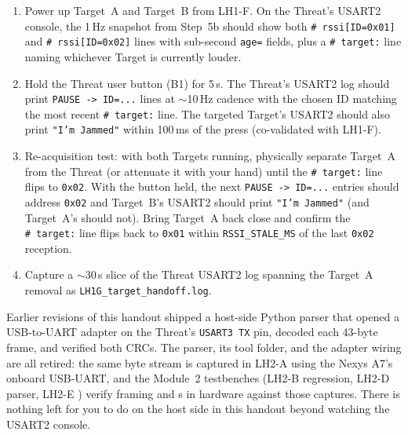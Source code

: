 \documentclass[11pt,letterpaper]{article}
\begin{document}
\begin{enumerate}[leftmargin=2em]
	\item Power up Target~A and Target~B from LH1-F. On the Threat's USART2 console, the 1\,Hz snapshot from Step~5b should show both \texttt{\#~rssi[ID=0x01]} and \texttt{\#~rssi[ID=0x02]} lines with sub-second \texttt{age=} fields, plus a \texttt{\#~target:} line naming whichever Target is currently louder.
	\item Hold the Threat user button (B1) for 5\,s. The Threat's USART2 log should print \texttt{PAUSE -> ID=...} lines at $\sim$10\,Hz cadence with the chosen ID matching the most recent \texttt{\#~target:} line. The targeted Target's USART2 should also print \texttt{"I'm Jammed"} within 100\,ms of the press (co-validated with LH1-F).
	\item Re-acquisition test: with both Targets running, physically separate Target~A from the Threat (or attenuate it with your hand) until the \texttt{\#~target:} line flips to \texttt{0x02}. With the button held, the next \texttt{PAUSE -> ID=...} entries should address \texttt{0x02} and Target~B's USART2 should print \texttt{"I'm Jammed"} (and Target~A's should not). Bring Target~A back close and confirm the \texttt{\#~target:} line flips back to \texttt{0x01} within \texttt{RSSI\_STALE\_MS} of the last \texttt{0x02} reception.
	\item Capture a $\sim$30\,s slice of the Threat USART2 log spanning the Target~A removal as \texttt{LH1G\_target\_handoff.log}.
\end{enumerate}

\begin{tcolorbox}[infobox={Where frame-level \CRC{} validation moved}]
Earlier revisions of this handout shipped a host-side Python parser that opened a USB-to-UART adapter on the Threat's \texttt{USART3 TX} pin, decoded each 43-byte frame, and verified both CRCs. The parser, its tool folder, and the adapter wiring are all retired: the same byte stream is captured in LH2-A using the Nexys A7's onboard USB-UART, and the Module~2 testbenches (LH2-B regression, LH2-D parser, LH2-E \CRC{}) verify framing and \CRC{}s in hardware against those captures. There is nothing left for you to do on the host side in this handout beyond watching the USART2 console.
\end{tcolorbox}

\newpage
\end{document}
